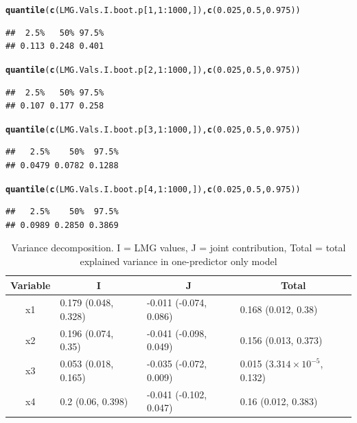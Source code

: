 \documentclass[11pt,a4paper,twoside]{book}
\makeatletter
\newcommand{\hlnum}[1]{\textcolor[rgb]{0.686,0.059,0.569}{#1}}%
\newcommand{\hlopt}[1]{\textcolor[rgb]{0,0,0}{#1}}%
\newcommand{\hlstd}[1]{\textcolor[rgb]{0.345,0.345,0.345}{#1}}%
\newcommand{\hlkwd}[1]{\textcolor[rgb]{0.737,0.353,0.396}{\textbf{#1}}}%
\newenvironment{kframe}{%
 \def\at@end@of@kframe{}%
 \ifinner\ifhmode%
  \def\at@end@of@kframe{\end{minipage}}%
  \begin{minipage}{\columnwidth}%
 \fi\fi%
 \def\FrameCommand##1{\hskip\@totalleftmargin \hskip-\fboxsep
 \colorbox{shadecolor}{##1}\hskip-\fboxsep
     \hskip-\linewidth \hskip-\@totalleftmargin \hskip\columnwidth}%
 \MakeFramed {\advance\hsize-\width
   \@totalleftmargin\z@ \linewidth\hsize
   \@setminipage}}%
 {\par\unskip\endMakeFramed%
 \at@end@of@kframe}
\newenvironment{knitrout}{}{} %
\makeatother
\begin{document}
\begin{knitrout}
\begin{kframe}
\begin{alltt}
\hlkwd{quantile}\hlstd{(}\hlkwd{c}\hlstd{(LMG.Vals.I.boot.p[}\hlnum{1}\hlstd{,}\hlnum{1}\hlopt{:}\hlnum{1000}\hlstd{,]),} \hlkwd{c}\hlstd{(}\hlnum{0.025}\hlstd{,} \hlnum{0.5}\hlstd{,} \hlnum{0.975}\hlstd{))}
\end{alltt}
\begin{verbatim}
##  2.5%   50% 97.5% 
## 0.113 0.248 0.401
\end{verbatim}
\begin{alltt}
\hlkwd{quantile}\hlstd{(}\hlkwd{c}\hlstd{(LMG.Vals.I.boot.p[}\hlnum{2}\hlstd{,}\hlnum{1}\hlopt{:}\hlnum{1000}\hlstd{,]),} \hlkwd{c}\hlstd{(}\hlnum{0.025}\hlstd{,} \hlnum{0.5}\hlstd{,} \hlnum{0.975}\hlstd{))}
\end{alltt}
\begin{verbatim}
##  2.5%   50% 97.5% 
## 0.107 0.177 0.258
\end{verbatim}
\begin{alltt}
\hlkwd{quantile}\hlstd{(}\hlkwd{c}\hlstd{(LMG.Vals.I.boot.p[}\hlnum{3}\hlstd{,}\hlnum{1}\hlopt{:}\hlnum{1000}\hlstd{,]),} \hlkwd{c}\hlstd{(}\hlnum{0.025}\hlstd{,} \hlnum{0.5}\hlstd{,} \hlnum{0.975}\hlstd{))}
\end{alltt}
\begin{verbatim}
##   2.5%    50%  97.5% 
## 0.0479 0.0782 0.1288
\end{verbatim}
\begin{alltt}
\hlkwd{quantile}\hlstd{(}\hlkwd{c}\hlstd{(LMG.Vals.I.boot.p[}\hlnum{4}\hlstd{,}\hlnum{1}\hlopt{:}\hlnum{1000}\hlstd{,]),} \hlkwd{c}\hlstd{(}\hlnum{0.025}\hlstd{,} \hlnum{0.5}\hlstd{,} \hlnum{0.975}\hlstd{))}
\end{alltt}
\begin{verbatim}
##   2.5%    50%  97.5% 
## 0.0989 0.2850 0.3869
\end{verbatim}
\end{kframe}
\end{knitrout}



\begin{table}[h]
\centering
\begin{tabular}{clll}
  \hline
  \multicolumn{1}{c}{\textbf{Variable}} & \multicolumn{1}{c}{\textbf{I}} &\multicolumn{1}{c}{\textbf{J}} & \multicolumn{1}{c}{\textbf{Total}} \\
  \hline
x1 & 0.179 (0.048, 0.328)  & -0.011 (-0.074, 0.086)   & 0.168 (0.012, 0.38)  \\ 
x2 & 0.196 (0.074, 0.35)  & -0.041 (-0.098, 0.049)   & 0.156 (0.013, 0.373)  \\ 
x3 & 0.053 (0.018, 0.165)  & -0.035 (-0.072, 0.009)   & 0.015 (\ensuremath{3.314\times 10^{-5}}, 0.132)  \\ 
x4 & 0.2 (0.06, 0.398)  & -0.041 (-0.102, 0.047)   & 0.16 (0.012, 0.383)  \\ 

   \hline
\end{tabular}
\caption{Variance decomposition. I = LMG values, J = joint contribution, Total = total explained variance in one-predictor only model}
\label{tbl:fundus.to.SLO2}
\end{table}
\end{document}
